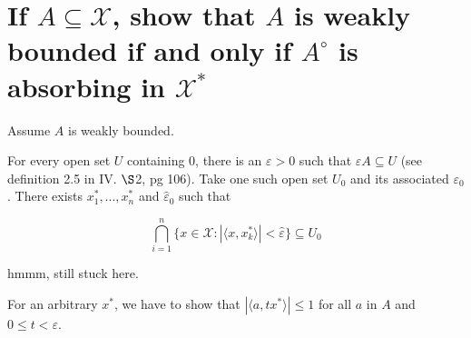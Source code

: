 \documentclass{article}
\begin{document}
\section{If $A\subseteq\mathscr{X}$, show that $A$ is weakly bounded if and only if $A^{\circ}$ is absorbing in $\mathscr{X}^*$}

Assume $A$ is weakly bounded. 

For every open set $U$ containing $0$, there is an $\varepsilon > 0$ such that $\varepsilon A \subseteq U$ (see definition 2.5 in IV. $\S$2, pg 106). Take one such open set $U_0$ and its associated $\varepsilon_0$. There exists $x^*_1, ..., x^*_n$ and $\hat{\varepsilon}_0$ such that 

$$\bigcap^n_{i=1}\{x \in \mathscr{X} : |\langle x, x^*_k \rangle| < \hat{\varepsilon} \} \subseteq U_0$$


hmmm, still stuck here.



For an arbitrary $x^*$, we have to show that $| \langle a, t x^* \rangle | \le 1$ for all $a$ in $A$ and $0 \le t < \varepsilon$.
\end{document}
